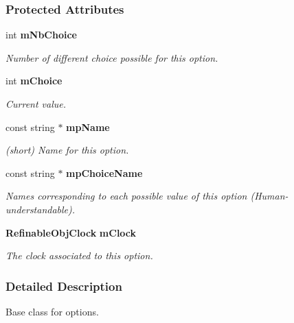 \subsubsection*{Protected Attributes}
\begin{DoxyCompactItemize}
\item 
int {\bf mNbChoice}\label{a00077_a54ae7b002c156671d5b2176a46cf95d5}

\begin{DoxyCompactList}\small\item\em Number of different choice possible for this option. \item\end{DoxyCompactList}\item 
int {\bf mChoice}\label{a00077_a34f40080b3adac88e5ab7e290dc951ae}

\begin{DoxyCompactList}\small\item\em Current value. \item\end{DoxyCompactList}\item 
const string $\ast$ {\bf mpName}
\begin{DoxyCompactList}\small\item\em (short) Name for this option. \item\end{DoxyCompactList}\item 
const string $\ast$ {\bf mpChoiceName}
\begin{DoxyCompactList}\small\item\em Names corresponding to each possible value of this option (Human-\/understandable). \item\end{DoxyCompactList}\item 
{\bf RefinableObjClock} {\bf mClock}\label{a00077_ace306a0100bbb1678c9b8683a009dc81}

\begin{DoxyCompactList}\small\item\em The clock associated to this option. \item\end{DoxyCompactList}\end{DoxyCompactItemize}


\subsubsection{Detailed Description}
Base class for options. 

